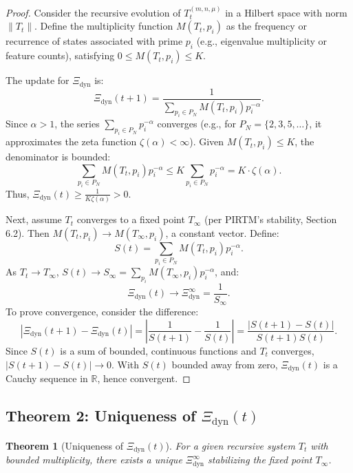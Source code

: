 \documentclass[12pt]{article}
\newtheorem{theorem}{Theorem}[section]
\begin{document}
\begin{proof}
Consider the recursive evolution of \( T_t^{(m, n, \mu)} \) in a Hilbert space with norm \( \| T_t \| \). Define the multiplicity function \( M(T_t, p_i) \) as the frequency or recurrence of states associated with prime \( p_i \) (e.g., eigenvalue multiplicity or feature counts), satisfying \( 0 \leq M(T_t, p_i) \leq K \).

The update for $\Xi_{\text{dyn}}$ is:
\[
\Xi_{\text{dyn}}(t+1) = \frac{1}{\sum_{p_i \in P_N} M(T_t, p_i) p_i^{-\alpha}}.
\]
Since \(\alpha > 1\), the series \(\sum_{p_i \in P_N} p_i^{-\alpha}\) converges (e.g., for \( P_N = \{2, 3, 5, \ldots\} \), it approximates the zeta function \(\zeta(\alpha) < \infty\)). Given \( M(T_t, p_i) \leq K \), the denominator is bounded:
\[
\sum_{p_i \in P_N} M(T_t, p_i) p_i^{-\alpha} \leq K \sum_{p_i \in P_N} p_i^{-\alpha} = K \cdot \zeta(\alpha).
\]
Thus, \(\Xi_{\text{dyn}}(t) \geq \frac{1}{K \zeta(\alpha)} > 0\).

Next, assume \( T_t \) converges to a fixed point \( T_\infty \) (per PIRTM’s stability, Section 6.2). Then \( M(T_t, p_i) \to M(T_\infty, p_i) \), a constant vector. Define:
\[
S(t) = \sum_{p_i \in P_N} M(T_t, p_i) p_i^{-\alpha}.
\]
As \( T_t \to T_\infty \), \( S(t) \to S_\infty = \sum_{p_i} M(T_\infty, p_i) p_i^{-\alpha} \), and:
\[
\Xi_{\text{dyn}}(t) \to \Xi_{\text{dyn}}^\infty = \frac{1}{S_\infty}.
\]
To prove convergence, consider the difference:
\[
|\Xi_{\text{dyn}}(t+1) - \Xi_{\text{dyn}}(t)| = \left| \frac{1}{S(t+1)} - \frac{1}{S(t)} \right| = \frac{|S(t+1) - S(t)|}{S(t+1) S(t)}.
\]
Since \( S(t) \) is a sum of bounded, continuous functions and \( T_t \) converges, \( |S(t+1) - S(t)| \to 0 \). With \( S(t) \) bounded away from zero, $\Xi_{\text{dyn}}(t)$ is a Cauchy sequence in \(\mathbb{R}\), hence convergent.
\end{proof}

\subsection{Theorem 2: Uniqueness of $\Xi_{\text{dyn}}(t)$}
\begin{theorem}[Uniqueness of $\Xi_{\text{dyn}}(t)$]
For a given recursive system \( T_t \) with bounded multiplicity, there exists a unique $\Xi_{\text{dyn}}^\infty$ stabilizing the fixed point \( T_\infty \).
\end{theorem}
\end{document}

